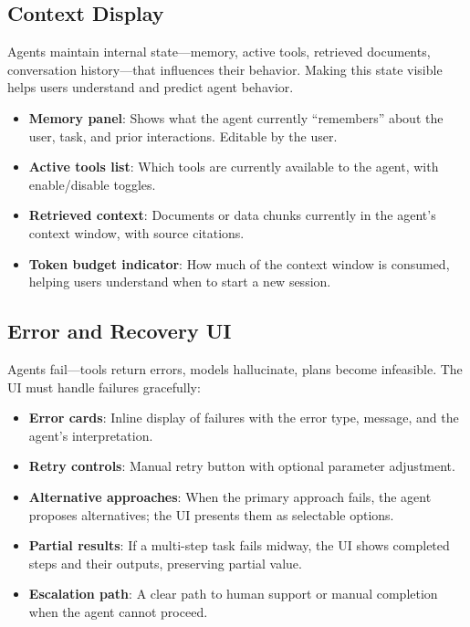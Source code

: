 \subsection{Context Display}
\label{context-display}

Agents maintain internal state---memory, active tools, retrieved documents, conversation history---that influences their behavior. Making this state visible helps users understand and predict agent behavior.

\begin{itemize}
  \item \textbf{Memory panel}: Shows what the agent currently ``remembers'' about the user, task, and prior interactions. Editable by the user.
  \item \textbf{Active tools list}: Which tools are currently available to the agent, with enable/disable toggles.
  \item \textbf{Retrieved context}: Documents or data chunks currently in the agent’s context window, with source citations.
  \item \textbf{Token budget indicator}: How much of the context window is consumed, helping users understand when to start a new session.
\end{itemize}

\subsection{Error and Recovery UI}
\label{error-and-recovery-ui}

Agents fail---tools return errors, models hallucinate, plans become infeasible. The UI must handle failures gracefully:

\begin{itemize}
  \item \textbf{Error cards}: Inline display of failures with the error type, message, and the agent’s interpretation.
  \item \textbf{Retry controls}: Manual retry button with optional parameter adjustment.
  \item \textbf{Alternative approaches}: When the primary approach fails, the agent proposes alternatives; the UI presents them as selectable options.
  \item \textbf{Partial results}: If a multi-step task fails midway, the UI shows completed steps and their outputs, preserving partial value.
  \item \textbf{Escalation path}: A clear path to human support or manual completion when the agent cannot proceed.
\end{itemize}

